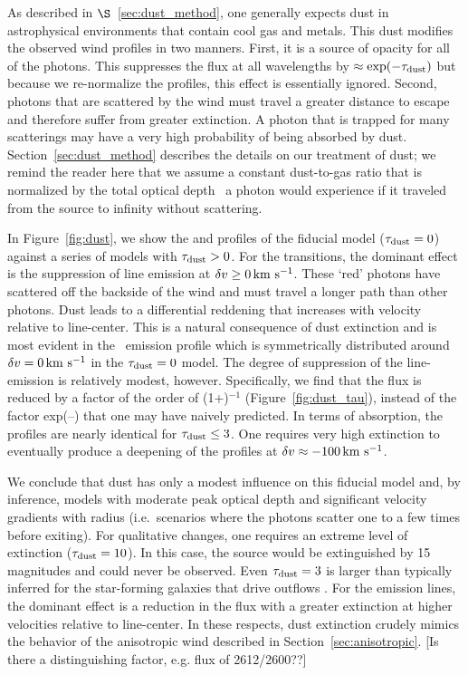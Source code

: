\documentclass[12pt,preprint]{aastex}
\begin{document}
As described in $\S$~\ref{sec:dust_method}, 
one generally expects dust in astrophysical environments that contain
cool gas and metals.  This dust 
modifies the observed wind profiles in two manners. 
First, it is a source of opacity for all of 
the photons.  This suppresses the flux at all
wavelengths by $\approx \exp(-\tau_{\rm dust})$ but because we re-normalize the
profiles, this effect is essentially ignored.  Second, photons that are
scattered by the wind must travel a greater
distance to escape and therefore suffer from greater extinction.  A photon that is
trapped for many scatterings may have a very high probability of being absorbed
by dust.  
Section~\ref{sec:dust_method} describes the details on our treatment of dust; we 
remind the reader here that we assume a constant dust-to-gas ratio 
that is normalized by the total optical
depth \taud\ a photon would experience if it traveled from the
source to infinity without scattering. 

In Figure~\ref{fig:dust}, we show the  and 
profiles of the fiducial model ($\tau_{\rm dust} = 0$) against a series of
models with $\tau_{\rm dust} > 0$.  For the  transitions, the
dominant effect is the suppression of line emission at $\delta v \ge 0
\, {\rm km~s^{-1}}$.  These `red' photons have scattered off the
backside of the wind and must travel a longer path than other
photons.  Dust leads to a differential reddening that increases with 
velocity relative to line-center. This is a natural consequence of dust
extinction and is most evident in the \feiic\ 
emission profile which is symmetrically distributed around
$\delta v= 0 \, {\rm km~s^{-1}}$ in the $\tau_{\rm dust}=0$ model.   
The degree of suppression of the line-emission is relatively modest,
however.  Specifically, we find that the flux is reduced by a factor 
of the order of (1+\taud)$^{-1}$ (Figure~\ref{fig:dust_tau}),
instead of the factor
exp(--\taud) that one may have naively predicted. 
In terms of absorption, the profiles are
nearly identical for $\tau_{\rm dust} \le 3$.  One requires very high
extinction to eventually produce a deepening of the profiles at 
$\delta v \approx -100 \, {\rm km~s^{-1}}$.

We conclude that dust has only a modest influence on this fiducial model and,
by inference, models with moderate peak optical depth and
significant velocity gradients with radius (i.e.\ scenarios where the
photons scatter one to a few times before exiting).
For qualitative changes, one requires an extreme level of
extinction ($\tau_{\rm dust} = 10$).  In this case, the source would be
extinguished by 15\,magnitudes and could never be observed. 
Even $\tau_{\rm dust} = 3$ is larger than typically inferred for the
star-forming galaxies that drive outflows \citep[e.g.][]{dust}.
For the emission lines,
the dominant effect is a reduction in the flux 
with a greater extinction at higher velocities relative to line-center.
In these respects, dust extinction crudely mimics the behavior of the
anisotropic
wind described in Section~\ref{sec:anisotropic}. [Is there a
distinguishing factor, e.g. flux of 2612/2600??]
\end{document}

